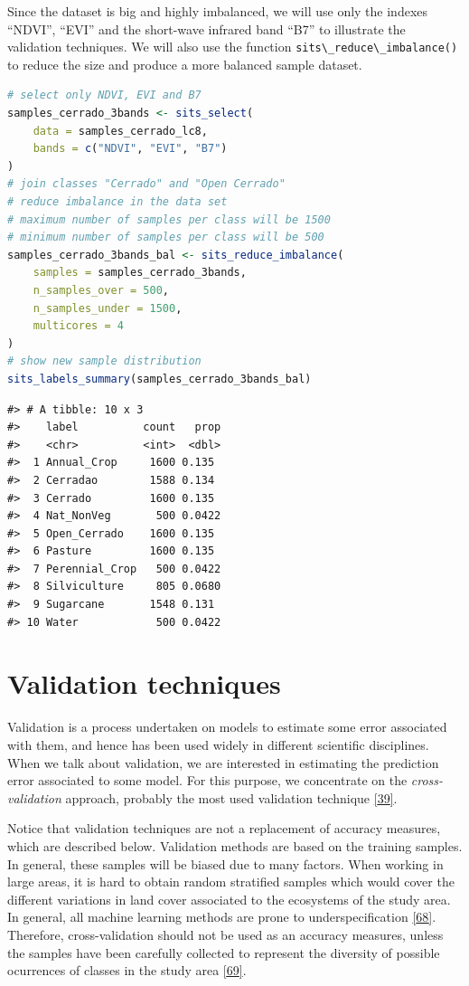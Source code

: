 \documentclass[
  11pt,
]{report}
\newcommand{\passthrough}[1]{#1}
\begin{document}
Since the dataset is big and highly imbalanced, we will use only the
indexes ``NDVI'', ``EVI'' and the short-wave infrared band ``B7'' to
illustrate the validation techniques. We will also use the function
\passthrough{\lstinline!sits\_reduce\_imbalance()!} to reduce the size
and produce a more balanced sample dataset.

\begin{lstlisting}[language=R]
# select only NDVI, EVI and B7
samples_cerrado_3bands <- sits_select(
    data = samples_cerrado_lc8,
    bands = c("NDVI", "EVI", "B7")
)
# join classes "Cerrado" and "Open Cerrado"
# reduce imbalance in the data set
# maximum number of samples per class will be 1500 
# minimum number of samples per class will be 500
samples_cerrado_3bands_bal <- sits_reduce_imbalance(
    samples = samples_cerrado_3bands,
    n_samples_over = 500,
    n_samples_under = 1500,
    multicores = 4
)
# show new sample distribution
sits_labels_summary(samples_cerrado_3bands_bal)
\end{lstlisting}

\begin{lstlisting}
#> # A tibble: 10 x 3
#>    label          count   prop
#>    <chr>          <int>  <dbl>
#>  1 Annual_Crop     1600 0.135 
#>  2 Cerradao        1588 0.134 
#>  3 Cerrado         1600 0.135 
#>  4 Nat_NonVeg       500 0.0422
#>  5 Open_Cerrado    1600 0.135 
#>  6 Pasture         1600 0.135 
#>  7 Perennial_Crop   500 0.0422
#>  8 Silviculture     805 0.0680
#>  9 Sugarcane       1548 0.131 
#> 10 Water            500 0.0422
\end{lstlisting}

\hypertarget{validation-techniques}{%
\section*{Validation techniques}\label{validation-techniques}}

Validation is a process undertaken on models to estimate some error
associated with them, and hence has been used widely in different
scientific disciplines. When we talk about validation, we are interested
in estimating the prediction error associated to some model. For this
purpose, we concentrate on the \emph{cross-validation} approach,
probably the most used validation technique
\protect\hyperlink{ref-Hastie2009}{{[}39{]}}.

Notice that validation techniques are not a replacement of accuracy
measures, which are described below. Validation methods are based on the
training samples. In general, these samples will be biased due to many
factors. When working in large areas, it is hard to obtain random
stratified samples which would cover the different variations in land
cover associated to the ecosystems of the study area. In general, all
machine learning methods are prone to underspecification
\protect\hyperlink{ref-DAmour2020}{{[}68{]}}. Therefore,
cross-validation should not be used as an accuracy measures, unless the
samples have been carefully collected to represent the diversity of
possible ocurrences of classes in the study area
\protect\hyperlink{ref-Wadoux2021}{{[}69{]}}.
\end{document}
